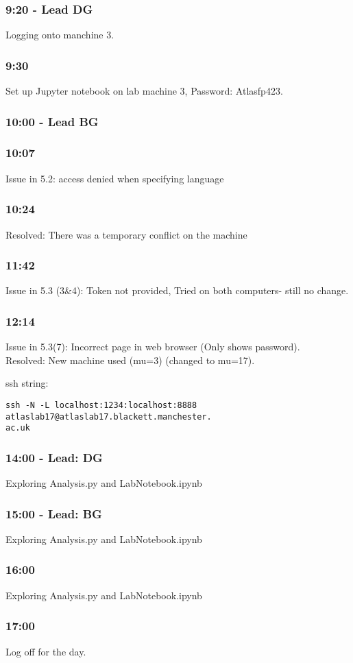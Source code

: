 \subsubsection*{\textbf{9:20} - Lead DG}
Logging onto manchine 3.

\subsubsection*{\textbf{9:30}}
Set up Jupyter notebook on lab machine 3, Password: Atlasfp423.

\subsubsection*{\textbf{10:00} - Lead BG}

\subsubsection*{\textbf{10:07}}
Issue in 5.2: access denied when specifying language

\subsubsection*{\textbf{10:24}}
Resolved: There was a temporary conflict on the machine

\subsubsection*{\textbf{11:42}}
Issue in 5.3 (3\&4): Token not provided, Tried on both computers- still no change.

\subsubsection*{\textbf{12:14}}
Issue in 5.3(7): Incorrect page in web browser (Only shows password).
\\
Resolved: New machine used (mu=3) (changed to mu=17).

ssh string:
\begin{lstlisting}
ssh -N -L localhost:1234:localhost:8888 atlaslab17@atlaslab17.blackett.manchester.
ac.uk
\end{lstlisting}

\subsubsection*{\textbf{14:00} - Lead: DG}
Exploring Analysis.py and LabNotebook.ipynb

\subsubsection*{\textbf{15:00} - Lead: BG}
Exploring Analysis.py and LabNotebook.ipynb

\subsubsection*{\textbf{16:00}}
Exploring Analysis.py and LabNotebook.ipynb

\subsubsection*{\textbf{17:00}}
Log off for the day.

